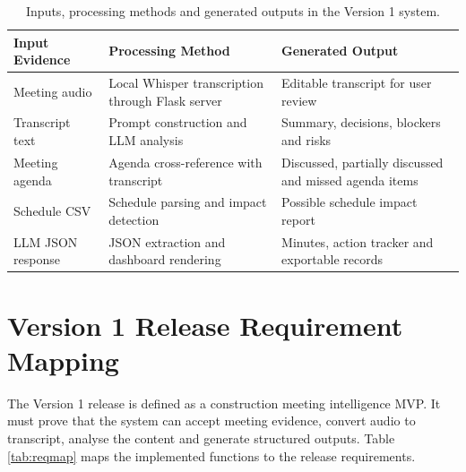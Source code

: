 \documentclass[11pt,a4paper]{article}
\begin{document}
\begin{table}[H]
\centering
\caption{Inputs, processing methods and generated outputs in the Version 1 system.}
\begin{tabularx}{\textwidth}{p{3.2cm}Y Y}
\toprule
\textbf{Input Evidence} & \textbf{Processing Method} & \textbf{Generated Output} \\
\midrule
Meeting audio & Local Whisper transcription through Flask server & Editable transcript for user review \\
Transcript text & Prompt construction and LLM analysis & Summary, decisions, blockers and risks \\
Meeting agenda & Agenda cross-reference with transcript & Discussed, partially discussed and missed agenda items \\
Schedule CSV & Schedule parsing and impact detection & Possible schedule impact report \\
LLM JSON response & JSON extraction and dashboard rendering & Minutes, action tracker and exportable records \\
\bottomrule
\end{tabularx}
\end{table}

\section{Version 1 Release Requirement Mapping}

The Version 1 release is defined as a construction meeting intelligence MVP. It must prove that the system can accept meeting evidence, convert audio to transcript, analyse the content and generate structured outputs. Table \ref{tab:reqmap} maps the implemented functions to the release requirements.
\end{document}
